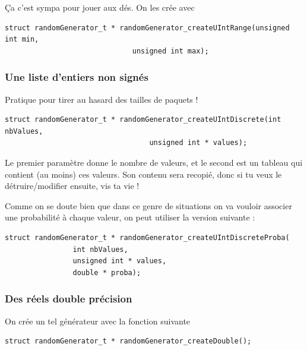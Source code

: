    Ça c'est sympa pour jouer aux dés. On les crée avec 

\begin{verbatim}
struct randomGenerator_t * randomGenerator_createUIntRange(unsigned int min,
						      unsigned int max);
\end{verbatim}

%
\subsubsection{Une liste d'entiers non signés}

   Pratique pour tirer au hasard des tailles de paquets !

\begin{verbatim}
struct randomGenerator_t * randomGenerator_createUIntDiscrete(int nbValues,
							      unsigned int * values);
\end{verbatim}

   Le premier paramètre donne le nombre de valeurs, et le second est
un tableau qui contient (au moins) ces valeurs. Son contenu sera
recopié, donc si tu veux le détruire/modifier ensuite, vis ta vie !

   Comme on se doute bien que dans ce genre de situations on va
vouloir associer une probabilité à chaque valeur, on peut utiliser la
version suivante :

\begin{verbatim}
struct randomGenerator_t * randomGenerator_createUIntDiscreteProba(
				int nbValues,
				unsigned int * values,
				double * proba);
\end{verbatim}

%
\subsubsection{Des réels double précision}

   On crée un tel générateur avec la fonction suivante

\begin{verbatim}
struct randomGenerator_t * randomGenerator_createDouble();
\end{verbatim}

